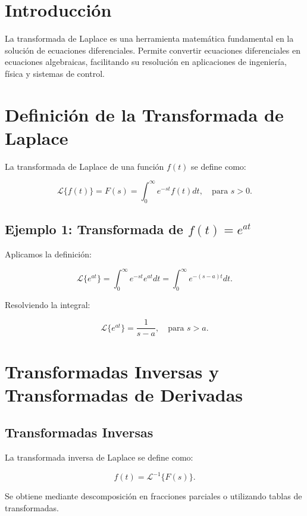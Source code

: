 
\section{Introducción}
La transformada de Laplace es una herramienta matemática fundamental en la solución de ecuaciones diferenciales. Permite convertir ecuaciones diferenciales en ecuaciones algebraicas, facilitando su resolución en aplicaciones de ingeniería, física y sistemas de control.

\section{Definición de la Transformada de Laplace}
La transformada de Laplace de una función \( f(t) \) se define como:

\begin{equation}
\mathcal{L} \{ f(t) \} = F(s) = \int_0^{\infty} e^{-st} f(t) dt, \quad \text{para } s > 0.
\end{equation}

\subsection*{Ejemplo 1: Transformada de \( f(t) = e^{at} \)}
Aplicamos la definición:

\begin{equation}
\mathcal{L} \{ e^{at} \} = \int_0^{\infty} e^{-st} e^{at} dt = \int_0^{\infty} e^{-(s-a)t} dt.
\end{equation}

Resolviendo la integral:

\begin{equation}
\mathcal{L} \{ e^{at} \} = \frac{1}{s-a}, \quad \text{para } s > a.
\end{equation}

\section{Transformadas Inversas y Transformadas de Derivadas}
\subsection{Transformadas Inversas}
La transformada inversa de Laplace se define como:

\begin{equation}
f(t) = \mathcal{L}^{-1} \{ F(s) \}.
\end{equation}

Se obtiene mediante descomposición en fracciones parciales o utilizando tablas de transformadas.

